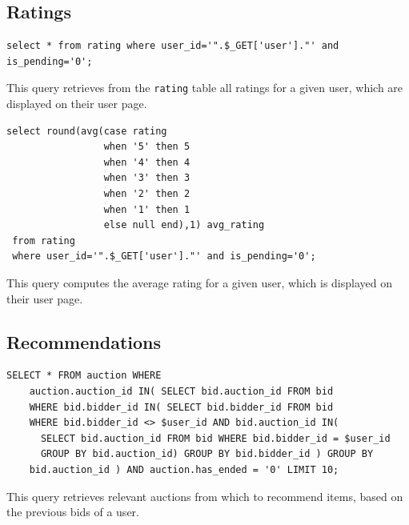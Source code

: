 \documentclass{article}
\begin{document}
\subsection{Ratings}
\begin{verbatim}
select * from rating where user_id='".$_GET['user']."' and is_pending='0';
\end{verbatim}
This query retrieves from the \texttt{rating} table all ratings for a given user, which are displayed on their user page.

\begin{verbatim}
select round(avg(case rating
                 when '5' then 5
                 when '4' then 4
                 when '3' then 3
                 when '2' then 2
                 when '1' then 1
                 else null end),1) avg_rating
 from rating
 where user_id='".$_GET['user']."' and is_pending='0';
\end{verbatim}
This query computes the average rating for a given user, which is displayed on their user page.

\subsection{Recommendations}
\begin{verbatim}
SELECT * FROM auction WHERE
    auction.auction_id IN( SELECT bid.auction_id FROM bid
    WHERE bid.bidder_id IN( SELECT bid.bidder_id FROM bid
    WHERE bid.bidder_id <> $user_id AND bid.auction_id IN(
      SELECT bid.auction_id FROM bid WHERE bid.bidder_id = $user_id
      GROUP BY bid.auction_id) GROUP BY bid.bidder_id ) GROUP BY
    bid.auction_id ) AND auction.has_ended = '0' LIMIT 10;
\end{verbatim}
This query retrieves relevant auctions from which to recommend items, based on the previous bids of a user.
\end{document}
